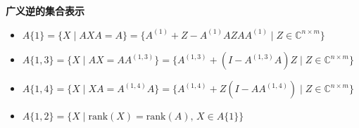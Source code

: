 \vskip 6pt \noindent\textbf{广义逆的集合表示}

\begin{itemize}
    \item $A\{1\}=\{X\mid AXA=A\}=\{A^{(1)}+Z-A^{(1)}AZAA^{(1)}\mid Z\in\mathbb C^{n\times m}\}$
    \item $A\{1,3\}=\{X\mid AX=AA^{(1,3)}\}=\{A^{(1,3)}+(I-A^{(1,3)}A)Z\mid Z\in\mathbb C^{n\times m}\}$
    \item $A\{1,4\}=\{X\mid XA=A^{(1,4)}A\}=\{A^{(1,4)}+Z(I-AA^{(1,4)})\mid Z\in\mathbb C^{n\times m}\}$
    \item $A\{1,2\}=\{X\mid \text{rank}(X)=\text{rank}(A),\,X\in A\{1\}\}$
\end{itemize}
